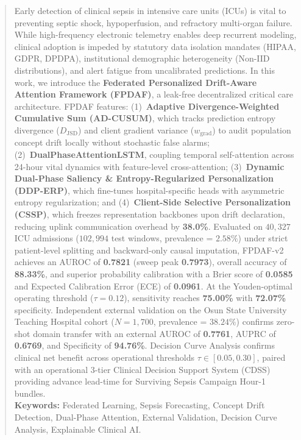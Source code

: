 \documentclass[10pt,a4paper,twocolumn,twoside]{article}
\begin{document}
\begin{abstract}
\noindent Early detection of clinical sepsis in intensive care units (ICUs) is vital to preventing septic shock, hypoperfusion, and refractory multi-organ failure. While high-frequency electronic telemetry enables deep recurrent modeling, clinical adoption is impeded by statutory data isolation mandates (HIPAA, GDPR, DPDPA), institutional demographic heterogeneity (Non-IID distributions), and alert fatigue from uncalibrated predictions. In this work, we introduce the \textbf{Federated Personalized Drift-Aware Attention Framework (FPDAF)}, a leak-free decentralized critical care architecture. FPDAF features: (1)~\textbf{Adaptive Divergence-Weighted Cumulative Sum (AD-CUSUM)}, which tracks prediction entropy divergence ($D_{\text{JSD}}$) and client gradient variance ($w_{\text{grad}}$) to audit population concept drift locally without stochastic false alarms; (2)~\textbf{DualPhaseAttentionLSTM}, coupling temporal self-attention across 24-hour vital dynamics with feature-level cross-attention; (3)~\textbf{Dynamic Dual-Phase Saliency \& Entropy-Regularized Personalization (DDP-ERP)}, which fine-tunes hospital-specific heads with asymmetric entropy regularization; and (4)~\textbf{Client-Side Selective Personalization (CSSP)}, which freezes representation backbones upon drift declaration, reducing uplink communication overhead by \textbf{38.0\%}. Evaluated on $40,327$ ICU admissions ($102,994$ test windows, prevalence = $2.58\%$) under strict patient-level splitting and backward-only causal imputation, FPDAF-v2 achieves an AUROC of \textbf{0.7821} (sweep peak \textbf{0.7973}), overall accuracy of \textbf{88.33\%}, and superior probability calibration with a Brier score of \textbf{0.0585} and Expected Calibration Error (ECE) of \textbf{0.0961}. At the Youden-optimal operating threshold ($\tau=0.12$), sensitivity reaches \textbf{75.00\%} with \textbf{72.07\%} specificity. Independent external validation on the Osun State University Teaching Hospital cohort ($N=1,700$, prevalence = $38.24\%$) confirms zero-shot domain transfer with an external AUROC of \textbf{0.7761}, AUPRC of \textbf{0.6769}, and Specificity of \textbf{94.76\%}. Decision Curve Analysis confirms clinical net benefit across operational thresholds $\tau \in [0.05, 0.30]$, paired with an operational 3-tier Clinical Decision Support System (CDSS) providing advance lead-time for Surviving Sepsis Campaign Hour-1 bundles.\\[0.15cm]
\textbf{Keywords:} Federated Learning, Sepsis Forecasting, Concept Drift Detection, Dual-Phase Attention, External Validation, Decision Curve Analysis, Explainable Clinical AI.
\end{abstract}
\end{document}
